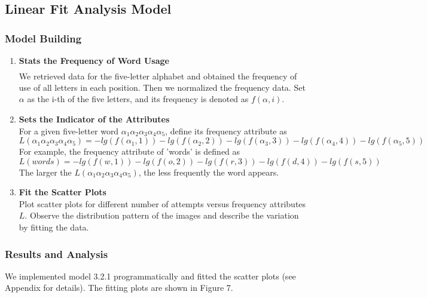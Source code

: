 \documentclass[12pt]{article}
\newcommand{\upcite}[1]{\textsuperscript{\textsuperscript{\cite{#1}}}}
\begin{document}
\subsection{Linear Fit Analysis Model}

\subsubsection{Model Building}

\begin{enumerate}
        \item \textbf{Stats the Frequency of Word Usage} \\
        We retrieved data for the five-letter alphabet\upcite{3} and obtained the frequency of use of all letters in each position. Then we normalized the frequency data.
        Set $\alpha$ as the i-th of the five letters, and its frequency is denoted as $f(\alpha,i)$.
        \item \textbf{Sets the Indicator of the Attributes} \\
        For a given five-letter word $\alpha_1\alpha_2\alpha_3\alpha_4\alpha_5$, define its frequency attribute as 
        \begin{equation}
           L(\alpha_1\alpha_2\alpha_3\alpha_4\alpha_5)=-lg(f(\alpha_1,1))-lg(f(\alpha_2,2))-lg(f(\alpha_3,3))-lg(f(\alpha_4,4))-lg(f(\alpha_5,5))
        \end{equation}
        For example, the frequency attribute of 'words' is defined as
        \begin{equation}
            L(words)=-lg(f(w,1))-lg(f(o,2))-lg(f(r,3))-lg(f(d,4))-lg(f(s,5))
        \end{equation}
        The larger the $L(\alpha_1\alpha_2\alpha_3\alpha_4\alpha_5)$, the less frequently the word appears.
        \item \textbf{Fit the Scatter Plots} \\
        Plot scatter plots for different number of attempts versus frequency attributes $L$. Observe the distribution pattern of the images and describe the variation by fitting the data.
\end{enumerate}

\subsubsection{Results and Analysis}
We implemented model 3.2.1 programmatically and fitted the scatter plots (see Appendix for details).
The fitting plots are shown in Figure 7.
\end{document}
